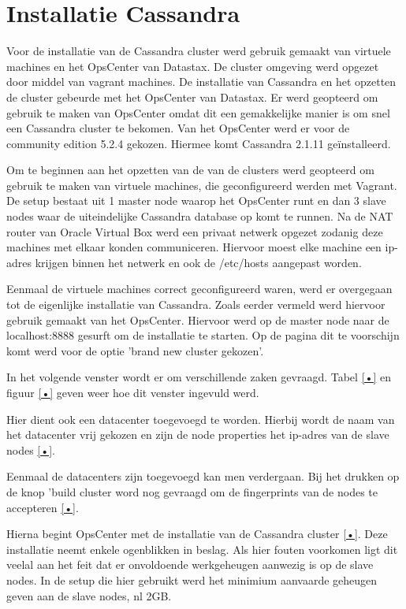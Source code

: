\chapter{Installatie Cassandra}
\label{ch:installatie_cassandra}

Voor de installatie van de Cassandra cluster werd gebruik gemaakt van virtuele machines en het OpsCenter van Datastax.
De cluster omgeving werd opgezet door middel van vagrant machines.
De installatie van Cassandra en het opzetten de cluster gebeurde met het OpsCenter van Datastax.
Er werd geopteerd om gebruik te maken van OpsCenter omdat dit een gemakkelijke manier is om snel een Cassandra cluster te bekomen.
Van het OpsCenter werd er voor de community edition 5.2.4 gekozen.
Hiermee komt Cassandra 2.1.11 geïnstalleerd.

Om te beginnen aan het opzetten van de van de clusters werd geopteerd om gebruik te maken van virtuele machines, die geconfigureerd werden met Vagrant.
De setup bestaat uit 1 master node waarop het OpsCenter runt en dan 3 slave nodes waar de uiteindelijke Cassandra database op komt te runnen.
Na de NAT router van Oracle Virtual Box werd een privaat netwerk opgezet zodanig deze machines met elkaar konden communiceren.
Hiervoor moest elke machine een ip-adres krijgen binnen het netwerk en ook de /etc/hosts aangepast worden.

Eenmaal de virtuele machines correct geconfigureerd waren, werd er overgegaan tot de eigenlijke installatie van Cassandra.
Zoals eerder vermeld werd hiervoor gebruik gemaakt van het OpsCenter.
Hiervoor werd op de master node naar de localhost:8888 gesurft om de installatie te starten. Op de pagina dit te voorschijn komt werd voor de optie 'brand new cluster gekozen'.

In het volgende venster wordt er om verschillende zaken gevraagd.
Tabel \ref{•} en figuur \ref{•} geven weer hoe dit venster ingevuld werd.

Hier dient ook een datacenter toegevoegd te worden.
Hierbij wordt de naam van het datacenter vrij gekozen en zijn de node properties het ip-adres van de slave nodes \ref{•}.

Eenmaal de datacenters zijn toegevoegd kan men verdergaan.
Bij het drukken op de knop 'build cluster word nog gevraagd om de fingerprints van de nodes te accepteren \ref{•}.

Hierna begint OpsCenter met de installatie van de Cassandra cluster \ref{•}.
Deze installatie neemt enkele ogenblikken in beslag.
Als hier fouten voorkomen ligt dit veelal aan het feit dat er onvoldoende werkgeheugen aanwezig is op de slave nodes.
In de setup die hier gebruikt werd het minimium aanvaarde geheugen geven aan de slave nodes, nl 2GB.